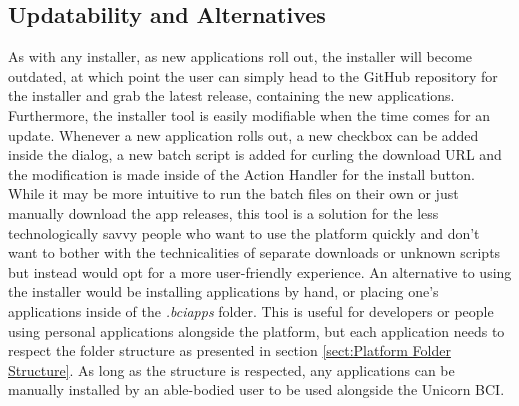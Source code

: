 \subsection{Updatability and Alternatives}
As with any installer, as new applications roll out, the installer will become outdated, at which point the user can simply head to the GitHub repository for the installer and grab the latest release, containing the new applications. Furthermore, the installer tool is easily modifiable when the time comes for an update. Whenever a new application rolls out, a new checkbox can be added inside the dialog, a new batch script is added for curling the download URL and the modification is made inside of the Action Handler for the install button. While it may be more intuitive to run the batch files on their own or just manually download the app releases, this tool is a solution for the less technologically savvy people who want to use the platform quickly and don't want to bother with the technicalities of separate downloads or unknown scripts but instead would opt for a more user-friendly experience.
\vspace{\baselineskip}\newline
An alternative to using the installer would be installing applications by hand, or placing one's applications inside of the \textit{.bciapps} folder. This is useful for developers or people using personal applications alongside the platform, but each application needs to respect the folder structure as presented in section \ref{sect:Platform Folder Structure}. As long as the structure is respected, any applications can be manually installed by an able-bodied user to be used alongside the Unicorn BCI.


